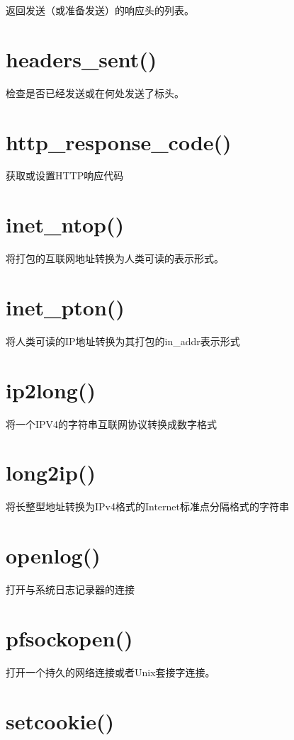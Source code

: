 返回发送（或准备发送）的响应头的列表。

\section{headers\_sent()}

检查是否已经发送或在何处发送了标头。

\section{http\_response\_code()}

获取或设置HTTP响应代码

\section{inet\_ntop()}

将打包的互联网地址转换为人类可读的表示形式。

\section{inet\_pton()}

将人类可读的IP地址转换为其打包的in\_addr表示形式


\section{ip2long()}

将一个IPV4的字符串互联网协议转换成数字格式

\section{long2ip()}

将长整型地址转换为IPv4格式的Internet标准点分隔格式的字符串

\section{openlog()}

打开与系统日志记录器的连接

\section{pfsockopen()}

打开一个持久的网络连接或者Unix套接字连接。

\section{setcookie()}

